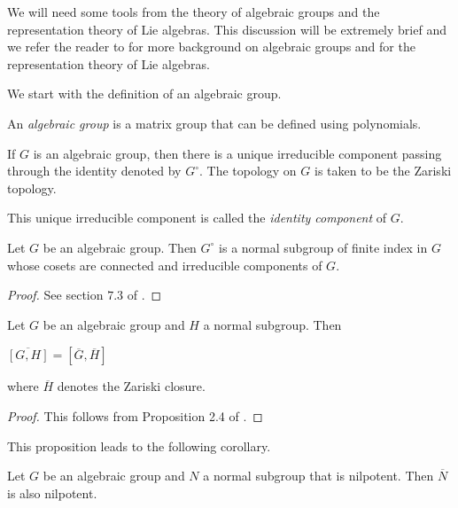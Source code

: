 We will need some tools from the theory of algebraic groups and the
representation theory of Lie algebras. This discussion will be extremely brief
and we refer the reader to \cite{humphreys1975linear} for more background on
algebraic groups and \cite{hall2003lie} for the representation theory of Lie
algebras.

We start with the definition of an algebraic group.
\begin{definition}
    An \textit{algebraic group} is a matrix group that can be defined using polynomials.
\end{definition}

If $G$ is an algebraic group, then there is a unique irreducible component
passing through the identity denoted by $G^{\circ}$. The topology on $G$ is
taken to be the Zariski topology.

\begin{remark}
    This unique irreducible component is called the \textit{identity component} of $G$.
\end{remark}

\begin{prop}
    Let $G$ be an algebraic group. Then $G^{\circ}$ is a normal subgroup of finite index in $G$ whose cosets are connected and
    irreducible components of $G$. \label{prop:identity-comp}
\end{prop}

\begin{proof}
    See section $7.3$ of \cite{humphreys1975linear}.
\end{proof}

\begin{prop}
    Let $G$ be an algebraic group and $H$ a normal subgroup. Then
    \begin{center}
        $\overline{[G, H]} = [\overline{G}, \overline{H}]$
    \end{center}
    where $\overline{H}$ denotes the Zariski closure. \label{prop:zariski-closure}
\end{prop}
\begin{proof}
    This follows from Proposition 2.4 of \cite{borel1991linear}.
\end{proof}

This proposition leads to the following corollary.
\begin{corollary}\label{corr:closure-nilpotent}
    Let $G$ be an algebraic group and $N$ a normal subgroup that is nilpotent. Then $\overline{N}$ is also nilpotent.
\end{corollary}

